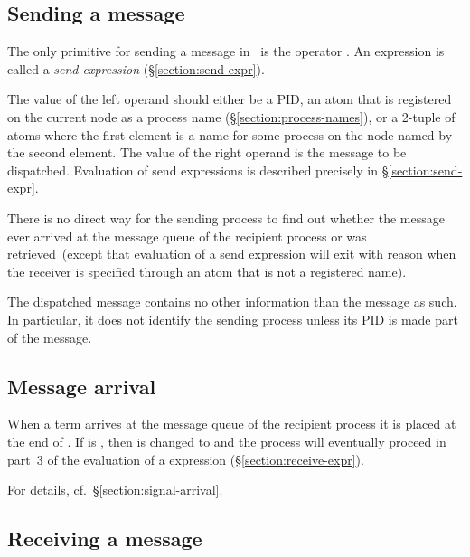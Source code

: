 \subsection{Sending a message}

\label{section:sending-messages}

The only primitive for sending a message in \Erlang\ is the operator \T{!}.
An expression  is called a \emph{send expression}
(\S\ref{section:send-expr}).

The value of the left operand should either be a PID, an atom that is
registered on the current node as a process name (\S\ref{section:process-names}),
or a 2-tuple of atoms where the first element is a name for some process on the node named
by the second element.
The value of the right
operand is the message to be dispatched. Evaluation of send expressions
is described precisely in \S\ref{section:send-expr}.

There is no direct way for the sending process to find out whether the
message ever arrived at the message queue of the recipient process or was
retrieved\ifOld\ (except that evaluation of a send expression will exit with reason
 when the receiver is specified through an atom that is not a registered name)\fi.

The dispatched message contains no other information than the message as such.
In particular, it does not identify the sending process unless its PID is made part of
the message.

\subsection{Message arrival}

\label{section:message-arrival}

When a term  arrives at the message queue
of the recipient process  it is placed
at the end of .  If  is , then
 is changed to  and the process will eventually proceed in
part~3 of the evaluation of a  expression (\S\ref{section:receive-expr}).

For details, cf.~\S\ref{section:signal-arrival}.

\subsection{Receiving a message}

